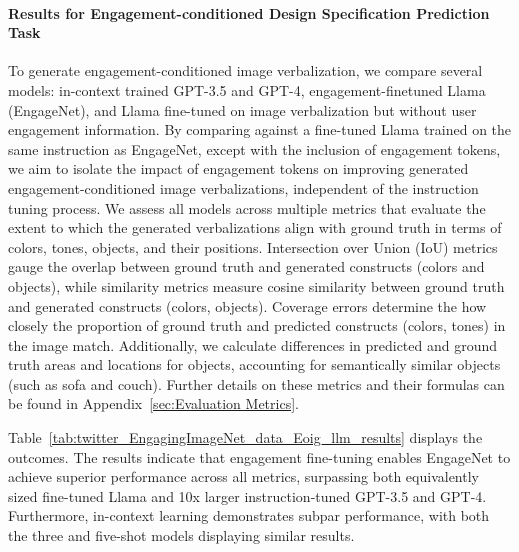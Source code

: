 \paragraph{Results for Engagement-conditioned Design Specification Prediction Task}
 To generate engagement-conditioned image verbalization, we compare several models: in-context trained GPT-3.5 and GPT-4, engagement-finetuned Llama (EngageNet), and Llama fine-tuned on image verbalization but without user engagement information. By comparing against a fine-tuned Llama trained on the same instruction as EngageNet, except with the inclusion of engagement tokens, we aim to isolate the impact of engagement tokens on improving generated engagement-conditioned image verbalizations, independent of the instruction tuning process. We assess all models across multiple metrics that evaluate the extent to which the generated verbalizations align with ground truth in terms of colors, tones, objects, and their positions. Intersection over Union (IoU) metrics gauge the overlap between ground truth and generated constructs (colors and objects), while similarity metrics measure cosine similarity between ground truth and generated constructs (colors, objects). Coverage errors determine the how closely the proportion of ground truth and predicted constructs (colors, tones) in the image match. Additionally, we calculate differences in predicted and ground truth areas and locations for objects, accounting for semantically similar objects (such as sofa and couch). Further details on these metrics and their formulas can be found in Appendix~\ref{sec:Evaluation Metrics}.
 
 
 Table~\ref{tab:twitter_EngagingImageNet_data_Eoig_llm_results} displays the outcomes. The results indicate that engagement fine-tuning enables EngageNet to achieve superior performance across all metrics, surpassing both equivalently sized fine-tuned Llama and 10x larger instruction-tuned GPT-3.5 and GPT-4. 
 Furthermore, in-context learning demonstrates subpar performance, with both the three and five-shot models displaying similar results.




